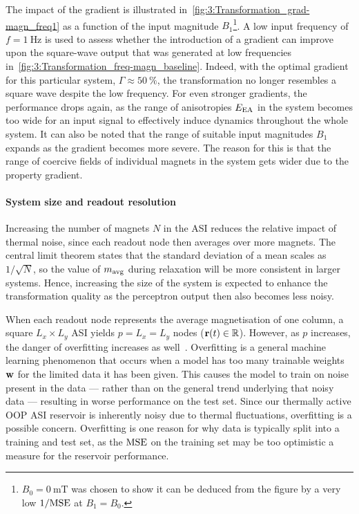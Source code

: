 The impact of the gradient is illustrated in~\cref{fig:3:Transformation_grad-magn_freq1} as a function of the input magnitude $B_1$\footnote{
	$B_0 = \SI{0}{\milli\tesla}$ was chosen to show it can be deduced from the figure by a very low $1/\mathrm{MSE}$ at $B_1 = B_0$.
}.
A low input frequency of $f=\SI{1}{\hertz}$ is used to assess whether the introduction of a gradient can improve upon the square-wave output that was generated at low frequencies in~\cref{fig:3:Transformation_freq-magn_baseline}.
Indeed, with the optimal gradient for this particular system, $\Gamma \approx \SI{50}{\percent}$, the transformation no longer resembles a square wave despite the low frequency.
For even stronger gradients, the performance drops again, as the range of anisotropies $E_\mathrm{EA}$ in the system becomes too wide for an input signal to effectively induce dynamics throughout the whole system.
It can also be noted that the range of suitable input magnitudes $B_1$ expands as the gradient becomes more severe.
The reason for this is that the range of coercive fields of individual magnets in the system gets wider due to the property gradient.

\paragraph{System size and readout resolution}
Increasing the number of magnets $N$ in the ASI reduces the relative impact of thermal noise, since each readout node then averages over more magnets.
The central limit theorem states that the standard deviation of a mean scales as $1/\sqrt{N}$, so the value of $m_\mathrm{avg}$ during relaxation will be more consistent in larger systems.
Hence, increasing the size of the system is expected to enhance the transformation quality as the perceptron output then also becomes less noisy. \\\par
When each readout node represents the average magnetisation of one column, a square $L_x \times L_y$ ASI yields $p = L_x = L_y$ nodes ($\boldsymbol{\mathbf{r}}(t) \in \mathbb{R}$).
However, as $p$ increases, the danger of overfitting increases as well~\cite{DeepRC_IonGating_Overfitting,lukovsevivcius2009reservoir}.
Overfitting is a general machine learning phenomenon that occurs when a model has too many trainable weights $\boldsymbol{\mathbf{w}}$ for the limited data it has been given.
This causes the model to train on noise present in the data --- rather than on the general trend underlying that noisy data --- resulting in worse performance on the test set.
Since our thermally active OOP ASI reservoir is inherently noisy due to thermal fluctuations, overfitting is a possible concern.
Overfitting is one reason for why data is typically split into a training and test set, as the $\mathrm{MSE}$ on the training set may be too optimistic a measure for the reservoir performance. \\\par

